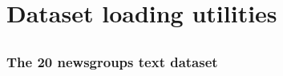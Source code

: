 \chapter{Dataset loading utilities\label{Dataset loading utilities}}
\section{}
\subsection{The 20 newsgroups text dataset\label{The 20 newsgroups text dataset}}

